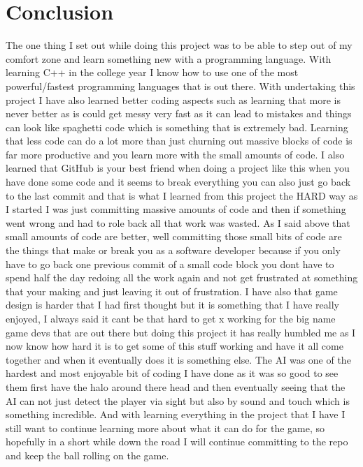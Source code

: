 \chapter{Conclusion}
The one thing I set out while doing this project was to be able to step out of my comfort zone and learn something new with a programming language. With learning C++ in the college year I know how to use one of the most powerful/fastest programming languages that is out there. With undertaking this project I have also learned better coding aspects such as learning that more is never better as is could get messy very fast as it can lead to mistakes and things can look like spaghetti code which is something that is extremely bad. Learning that less code can do a lot more than just churning out massive blocks of code is far more productive and you learn more with the small amounts of code. I also learned that GitHub is your best friend when doing a project like this when you have done some code and it seems to break everything you can also just go back to the last commit and that is what I learned from this project the HARD way as I started I was just committing massive amounts of code and then if something went wrong and had to role back all that work was wasted. As I said above that small amounts of code are better, well committing those small bits of code are the things that make or break you as a software developer because if you only have to go back one previous commit of a small code block you dont have to spend half the day redoing all the work again and not get frustrated at something that your making and just leaving it out of frustration.
\newline
\newline
I have also that game design is harder that I had first thought but it is something that I have really enjoyed, I always said it cant be that hard to get x working for the big name game devs that are out there but doing this project it has really humbled me as I now know how hard it is to get some of this stuff working and have it all come together and when it eventually does it is something else. The AI was one of the hardest and most enjoyable bit of coding I have done as it was so good to see them first have the halo around there head and then eventually seeing that the AI can not just detect the player via sight but also by sound and touch which is something incredible. And with learning everything in the project that I have I still want to continue learning more about what it can do for the game, so hopefully in a short while down the road I will continue committing to the repo and keep the ball rolling on the game. 



